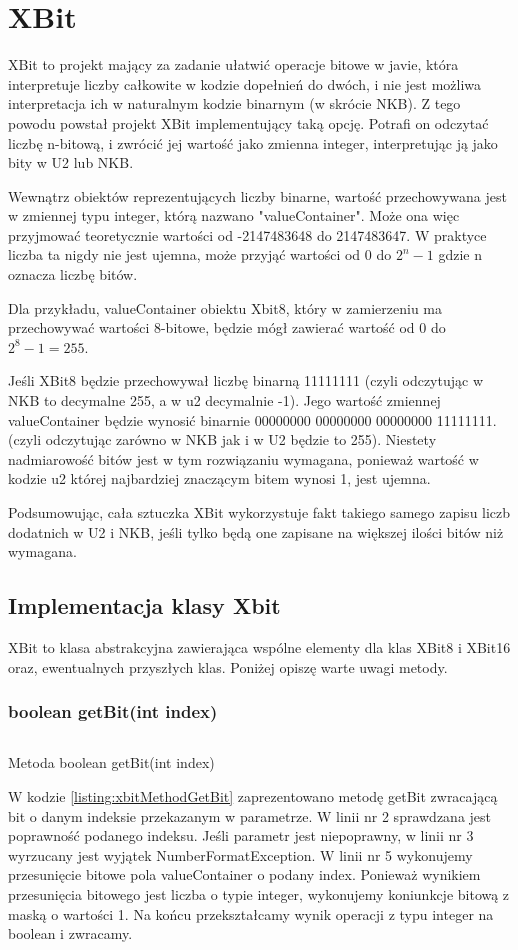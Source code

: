 \section{XBit}
XBit to projekt mający za zadanie ułatwić operacje bitowe w javie, która interpretuje liczby całkowite w kodzie dopełnień do dwóch, i nie jest możliwa interpretacja ich w naturalnym kodzie binarnym (w skrócie NKB). Z tego powodu powstał projekt XBit implementujący taką opcję. Potrafi on odczytać liczbę n-bitową, i zwrócić jej wartość jako zmienna integer, interpretując ją jako bity w U2 lub NKB.



Wewnątrz obiektów reprezentujących liczby binarne, wartość przechowywana jest w zmiennej typu integer, którą nazwano "valueContainer". Może ona więc przyjmować teoretycznie wartości od -2147483648 do 2147483647. W praktyce liczba ta nigdy nie jest ujemna, może przyjąć wartości od 0 do $ 2^{n}-1 $ gdzie n oznacza liczbę bitów. 

Dla przykładu,  valueContainer obiektu Xbit8, który w zamierzeniu ma przechowywać wartości 8-bitowe, będzie mógł zawierać wartość od 0 do $ 2^{8}-1 = 255 $. 

Jeśli XBit8 będzie przechowywał liczbę binarną 11111111 (czyli odczytując w NKB to decymalne 255, a w u2 decymalnie -1). Jego wartość zmiennej valueContainer będzie wynosić binarnie 
00000000 00000000 00000000 11111111. (czyli odczytując zarówno w NKB jak i w U2 będzie to 255). Niestety nadmiarowość bitów jest w tym rozwiązaniu wymagana, ponieważ wartość w kodzie u2 której najbardziej znaczącym bitem wynosi 1, jest ujemna. 

Podsumowując, cała sztuczka XBit wykorzystuje fakt takiego samego zapisu liczb dodatnich w U2 i NKB, jeśli tylko będą one zapisane na większej ilości bitów niż wymagana.


\subsection{Implementacja klasy Xbit}
XBit to klasa abstrakcyjna zawierająca wspólne elementy dla klas XBit8 i XBit16 oraz, ewentualnych przyszłych klas. Poniżej opiszę warte uwagi metody.

\subsubsection{boolean getBit(int index)}

\begin{listing}[h]
	\inputminted{java}{listings/xbit/xbitMethodGetBit.java}
	\caption{Metoda boolean getBit(int index)}
	\label{listing:xbitMethodGetBit}
\end{listing}
W kodzie \ref{listing:xbitMethodGetBit} zaprezentowano metodę getBit zwracającą bit o danym indeksie przekazanym w parametrze. W linii nr 2 sprawdzana jest poprawność podanego indeksu. Jeśli parametr jest niepoprawny, w linii nr 3 wyrzucany jest wyjątek NumberFormatException. W linii nr 5 wykonujemy przesunięcie bitowe pola valueContainer o podany index. Ponieważ wynikiem przesunięcia bitowego jest liczba o typie integer, wykonujemy koniunkcje bitową z maską o wartości 1. Na końcu przekształcamy wynik operacji z typu integer na boolean i zwracamy.

